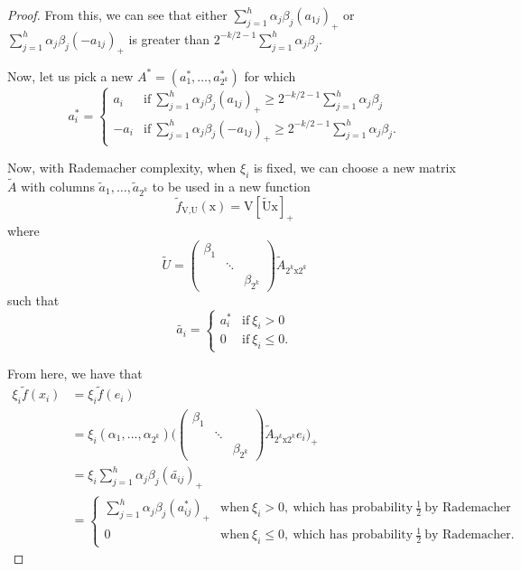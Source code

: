 \documentclass[twoside]{article}
\theoremstyle{definition}
\theoremstyle{definition}
\theoremstyle{remark}
\begin{document}
\begin{proof}
From this, we can see that either $\sum \limits_{j=1}^h \alpha_j \beta_j (a_{1j})_+$
or $\sum \limits_{j=1}^h \alpha_j \beta_j (-a_{1j})_+$ is greater than $2^{-k/2-1} \sum \limits_{j=1}^h \alpha_j \beta_j$.

Now, let us pick a new $A^* = (a_1^*,\ldots,a_{2^k}^*)$ for which
\[
a_i^* = \begin{cases}
a_i & \text{if} \ \sum \limits_{j=1}^h \alpha_j \beta_j (a_{1j})_+ \geq 2^{-k/2-1} \sum \limits_{j=1}^h \alpha_j \beta_j \\
-a_i & \text{if} \ \sum \limits_{j=1}^h \alpha_j \beta_j (-a_{1j})_+ \geq 2^{-k/2-1} \sum \limits_{j=1}^h \alpha_j \beta_j.
\end{cases}
\]

Now, with Rademacher complexity, when $\xi_i$ is fixed, we can choose a new matrix $\widetilde{A}$ with columns $\tilde{a}_1,\ldots,\tilde{a}_{2^k}$ to be used in a new function
\[
\tilde{f}_\text{V,U}(\text{x})=\text{V}[\widetilde{\text{U}}\text{x}]_+
\]
where
\[
\widetilde{U} = \begin{pmatrix} 
\beta_1 & & \\
& \ddots & \\
& & \beta_{2^k}
\end{pmatrix}
\widetilde{A}_{2^k \text{x} 2^k} 
\]
such that
\[
\tilde{a_i} = \begin{cases}
a_i^* & \text{if} \ \xi_i > 0 \\
0 & \text{if} \ \xi_i \leq 0.
\end{cases}
\]

From here, we have that
\[
\begin{aligned}
\xi_i \tilde{f}(x_i) &= \xi_i \tilde{f}(e_i) \\
&= \xi_i (\alpha_1,\ldots,\alpha_{2^k}) \Bigg( \begin{pmatrix} 
\beta_1 & & \\
& \ddots & \\
& & \beta_{2^k}
\end{pmatrix}
\widetilde{A}_{2^k \text{x} 2^k} e_i \Bigg)_+ \\
&= \xi_i \sum \limits_{j=1}^h \alpha_j \beta_j (\tilde{a_{ij}})_+ \\
&= \begin{cases}
\sum \limits_{j=1}^h \alpha_j \beta_j (a_{ij}^*)_+ & \text{when} \ \xi_i > 0, \ \text{which has probability} \ \frac{1}{2} \ \text{by Rademacher} \\
0 & \text{when} \ \xi_i \leq 0, \ \text{which has probability} \ \frac{1}{2} \ \text{by Rademacher}.
\end{cases}
\end{aligned}
\]


\end{proof}
\end{document}
